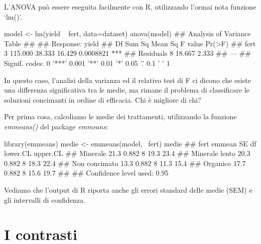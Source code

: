 \documentclass[a4paper,12pt,oneside]{book}
\newenvironment{Shaded}{}{}
\newcommand{\KeywordTok}[1]{#1}
\newcommand{\DataTypeTok}[1]{#1}
\newcommand{\StringTok}[1]{#1}
\newcommand{\CommentTok}[1]{#1}
\newcommand{\OperatorTok}[1]{#1}
\newcommand{\NormalTok}[1]{#1}
\begin{document}
L'ANOVA può essere eseguita facilmente con R, utilizzando l'ormai nota funzione `lm()'.

\begin{Shaded}
\begin{Highlighting}[]
\NormalTok{model <-}\StringTok{ }\KeywordTok{lm}\NormalTok{(yield }\OperatorTok{~}\StringTok{ }\NormalTok{fert, }\DataTypeTok{data=}\NormalTok{dataset)}
\KeywordTok{anova}\NormalTok{(model)}
\CommentTok{## Analysis of Variance Table}
\CommentTok{## }
\CommentTok{## Response: yield}
\CommentTok{##           Df  Sum Sq Mean Sq F value    Pr(>F)    }
\CommentTok{## fert       3 115.000  38.333  16.429 0.0008821 ***}
\CommentTok{## Residuals  8  18.667   2.333                      }
\CommentTok{## ---}
\CommentTok{## Signif. codes:  0 '***' 0.001 '**' 0.01 '*' 0.05 '.' 0.1 ' ' 1}
\end{Highlighting}
\end{Shaded}

In questo caso, l'analisi della varianza ed il relativo test di F ci dicono che esiste una differenza significativa tra le medie, ma rimane il problema di classificare le soluzioni concimanti in ordine di efficacia. Chi è migliore di chi?

Per prima cosa, calcoliamo le medie dei trattamenti, utilizzando la funzione \emph{emmeans()} del package \emph{emmeans}:

\begin{Shaded}
\begin{Highlighting}[]
\KeywordTok{library}\NormalTok{(emmeans)}
\NormalTok{medie <-}\StringTok{ }\KeywordTok{emmeans}\NormalTok{(model, }\OperatorTok{~}\NormalTok{fert)}
\NormalTok{medie}
\CommentTok{##  fert           emmean    SE df lower.CL upper.CL}
\CommentTok{##  Minerale         21.3 0.882  8     19.3     23.4}
\CommentTok{##  Minerale lento   20.3 0.882  8     18.3     22.4}
\CommentTok{##  Non concimato    13.3 0.882  8     11.3     15.4}
\CommentTok{##  Organico         17.7 0.882  8     15.6     19.7}
\CommentTok{## }
\CommentTok{## Confidence level used: 0.95}
\end{Highlighting}
\end{Shaded}

Vediamo che l'output di R riporta anche gli errori standard delle medie (SEM) e gli intervalli di confidenza.

\hypertarget{i-contrasti}{%
\section{I contrasti}\label{i-contrasti}}
\end{document}
